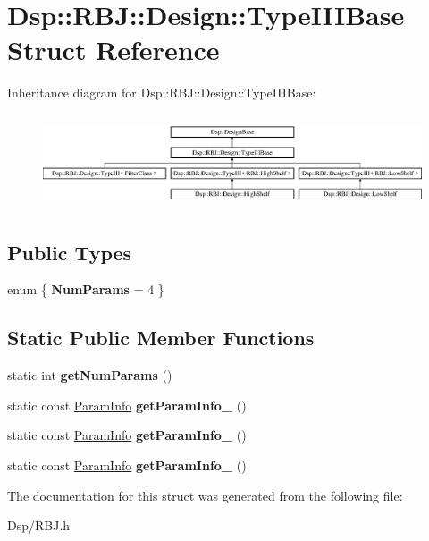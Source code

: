 \hypertarget{structDsp_1_1RBJ_1_1Design_1_1TypeIIIBase}{\section{Dsp\-:\-:R\-B\-J\-:\-:Design\-:\-:Type\-I\-I\-I\-Base Struct Reference}
\label{structDsp_1_1RBJ_1_1Design_1_1TypeIIIBase}
}
Inheritance diagram for Dsp\-:\-:R\-B\-J\-:\-:Design\-:\-:Type\-I\-I\-I\-Base\-:\begin{figure}[H]
\begin{center}
\leavevmode
\includegraphics[height=2.796504cm]{structDsp_1_1RBJ_1_1Design_1_1TypeIIIBase}
\end{center}
\end{figure}
\subsection*{Public Types}
\begin{DoxyCompactItemize}
\item 
enum \{ {\bfseries Num\-Params} =  4
 \}
\end{DoxyCompactItemize}
\subsection*{Static Public Member Functions}
\begin{DoxyCompactItemize}
\item 
\hypertarget{structDsp_1_1RBJ_1_1Design_1_1TypeIIIBase_a3ca43dc9003cc0659d670bb56d07adf3}{static int {\bfseries get\-Num\-Params} ()}\label{structDsp_1_1RBJ_1_1Design_1_1TypeIIIBase_a3ca43dc9003cc0659d670bb56d07adf3}

\item 
\hypertarget{structDsp_1_1RBJ_1_1Design_1_1TypeIIIBase_a974f0e4cc300e1e5f1e4fccd38721c93}{static const \hyperlink{classDsp_1_1ParamInfo}{Param\-Info} {\bfseries get\-Param\-Info\-\_} ()}\label{structDsp_1_1RBJ_1_1Design_1_1TypeIIIBase_a974f0e4cc300e1e5f1e4fccd38721c93}

\item 
\hypertarget{structDsp_1_1RBJ_1_1Design_1_1TypeIIIBase_acdaa75f40e948e215940f7be77d9a22d}{static const \hyperlink{classDsp_1_1ParamInfo}{Param\-Info} {\bfseries get\-Param\-Info\-\_} ()}\label{structDsp_1_1RBJ_1_1Design_1_1TypeIIIBase_acdaa75f40e948e215940f7be77d9a22d}

\item 
\hypertarget{structDsp_1_1RBJ_1_1Design_1_1TypeIIIBase_a2251c8b979d05b99432d6e9f6b2ab5cb}{static const \hyperlink{classDsp_1_1ParamInfo}{Param\-Info} {\bfseries get\-Param\-Info\-\_} ()}\label{structDsp_1_1RBJ_1_1Design_1_1TypeIIIBase_a2251c8b979d05b99432d6e9f6b2ab5cb}

\end{DoxyCompactItemize}


The documentation for this struct was generated from the following file\-:\begin{DoxyCompactItemize}
\item 
Dsp/R\-B\-J.\-h\end{DoxyCompactItemize}
